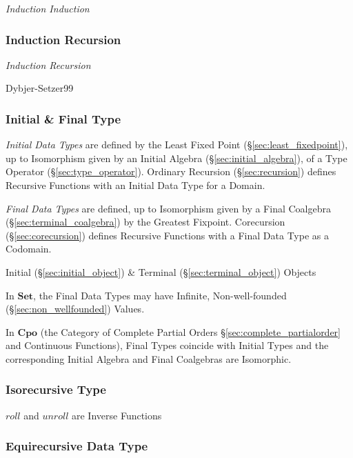 \emph{Induction Induction}



\subsubsection{Induction Recursion}\label{sec:induction_recursion}

\emph{Induction Recursion}

Dybjer-Setzer99



\subsubsection{Initial \& Final Type}\label{sec:initial_final_type}

\emph{Initial Data Types} are defined by the Least Fixed Point
(\S\ref{sec:least_fixedpoint}), up to Isomorphism given by an Initial
Algebra (\S\ref{sec:initial_algebra}), of a Type Operator
(\S\ref{sec:type_operator}). Ordinary Recursion
(\S\ref{sec:recursion}) defines Recursive Functions with an Initial
Data Type for a Domain.

\emph{Final Data Types} are defined, up to Isomorphism given by a
Final Coalgebra (\S\ref{sec:terminal_coalgebra}) by the Greatest
Fixpoint. Corecursion (\S\ref{sec:corecursion}) defines Recursive
Functions with a Final Data Type as a Codomain.

Initial (\S\ref{sec:initial_object}) \& Terminal
(\S\ref{sec:terminal_object}) Objects

In $\mathbf{Set}$, the Final Data Types may have Infinite,
Non-well-founded (\S\ref{sec:non_wellfounded}) Values.

In $\mathbf{Cpo}$ (the Category of Complete Partial Orders
\S\ref{sec:complete_partialorder} and Continuous Functions), Final
Types coincide with Initial Types and the corresponding Initial
Algebra and Final Coalgebras are Isomorphic.



\subsubsection{Isorecursive Type}\label{sec:isorecursive_type}

$roll$ and $unroll$ are Inverse Functions



\subsubsection{Equirecursive Data Type}\label{sec:equirecursive_type}

